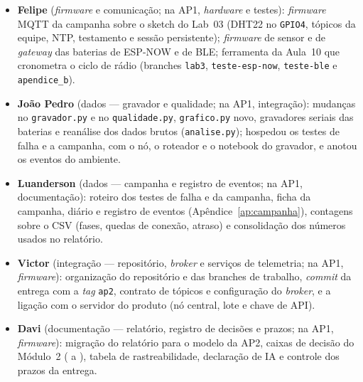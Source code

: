 \begin{itemize}
  \item \textbf{Felipe} (\emph{firmware} e comunicação; na AP1,
    \emph{hardware} e testes): \emph{firmware} MQTT da campanha sobre o
    sketch do Lab~03 (DHT22 no \texttt{GPIO4}, tópicos da equipe, NTP,
    testamento e sessão persistente); \emph{firmware} de sensor e de
    \emph{gateway} das baterias de ESP-NOW e de BLE; ferramenta da
    Aula~10 que cronometra o ciclo de rádio (branches \texttt{lab3},
    \texttt{teste-esp-now}, \texttt{teste-ble} e
    \texttt{apendice\_b}).
  \item \textbf{João Pedro} (dados --- gravador e qualidade; na AP1,
    integração): mudanças no \texttt{gravador.py} e no
    \texttt{qualidade.py}, \texttt{grafico.py} novo, gravadores seriais
    das baterias e reanálise dos dados brutos (\texttt{analise.py});
    hospedou os testes de falha e a campanha, com o nó, o roteador e o
    notebook do gravador, e anotou os eventos do ambiente.
  \item \textbf{Luanderson} (dados --- campanha e registro de eventos;
    na AP1, documentação): roteiro dos testes de falha e da campanha,
    ficha da campanha, diário e registro de eventos
    (Apêndice~\ref{ap:campanha}), contagens sobre o CSV (fases, quedas de
    conexão, atraso) e consolidação dos números usados no relatório.
  \item \textbf{Victor} (integração --- repositório, \emph{broker} e
    serviços de telemetria; na AP1, \emph{firmware}): organização do
    repositório e das branches de trabalho, \emph{commit} da entrega com
    a \emph{tag} \texttt{ap2}, contrato de tópicos e configuração do
    \emph{broker}, e a ligação com o servidor do produto (nó central,
    lote e chave de API).
  \item \textbf{Davi} (documentação --- relatório, registro de decisões e
    prazos; na AP1, \emph{firmware}): migração do relatório para o modelo
    da AP2, caixas de decisão do Módulo~2 ( a ), tabela de
    rastreabilidade, declaração de IA e controle dos prazos da entrega.
\end{itemize}

\imprimirTabelaIntegrantes
